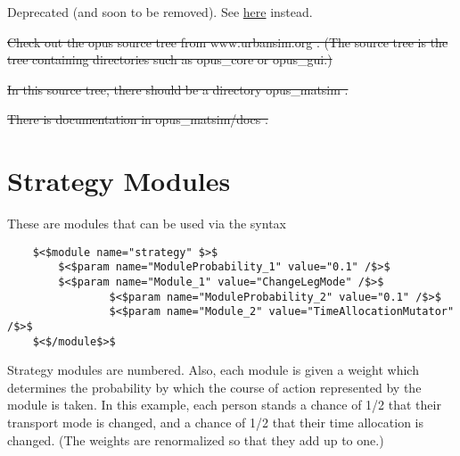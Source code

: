 \documentclass[a4paper,11pt]{report}
\begin{document}
Deprecated (and soon to be removed). See \href{http://matsim.org/extensions/matsim4urbansim}{here} instead.



\sout{Check  out the opus source tree from www.urbansim.org . (The source tree  is the tree containing directories such as opus\_core or opus\_gui.)}

\sout{In this source tree, there should be a directory opus\_matsim .}

\sout{There is documentation in opus\_matsim/docs .}


\chapter{Strategy Modules}




These are modules that can be used via the syntax
\begin{verbatim}
	$<$module name="strategy" $>$
		$<$param name="ModuleProbability_1" value="0.1" /$>$
		$<$param name="Module_1" value="ChangeLegMode" /$>$
                $<$param name="ModuleProbability_2" value="0.1" /$>$
                $<$param name="Module_2" value="TimeAllocationMutator" /$>$
	$<$/module$>$
\end{verbatim}


Strategy modules are numbered. Also, each  module is given a weight which determines the probability by which the  course of action represented by the module is taken. In this example,  each person stands a chance of 1/2 that their transport mode is changed,  and a chance of 1/2 that their time allocation is changed. (The  weights are renormalized so that they add up to one.)
\end{document}
